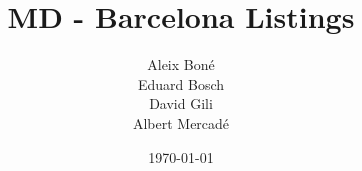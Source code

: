 


\title{MD - \airbnb Barcelona Listings}
\author{
    Aleix Bon\'e\\
    Eduard Bosch\\
    David Gili\\
    Albert Mercad\'e
}
\date{\today}


\graphicspath{{../../analysis/plots/}{images}}

\newcommand{\airbnb}{\emph{Airbnb}\xspace}
\newcommand{\NA}{\emph{NA}\xspace}

\newcommand{\profiling}[3]{
\begin{figure}[H]
    \centering
    \texttt{[image: prof-c3-\#1-\#2]}
    \caption{#3}%
    \label{fig:prof-#1-#2}
\end{figure}
}

\newcommand{\fig}[3][0.6]{
    \begin{figure}[H]
        \centering
        \texttt{[image: \#2]}
        \caption{#3}%
        \label{fig:#2}
    \end{figure}
}

\newcommand{\hibp}[2]{
    \begin{figure}[H]
        \centering
        \texttt{[image: desc-\#1-hi\_bp]}
        \caption{Histogram \& Boxplot of #2}%
        \label{fig:#1}
    \end{figure}
}

\newcommand{\tabn}[2]{
    \begin{table}[H]
        \centering
        \caption{Extended summary statistics of #2}%
        \label{tab:#1}
        
    \end{table}
}

\newcommand{\factorialmap}[2]{
    \begin{figure}[H]
        \centering
        \texttt{[image: pca\_fact-plane\_\#1\_\#2-bi]}
        \caption{PCA plane #1 vs #2}%
        \label{fig:plane_#1-#2}
    \end{figure}
}

\newcommand{\fign}[2]{
    \hibp{#1}{#2}
}


